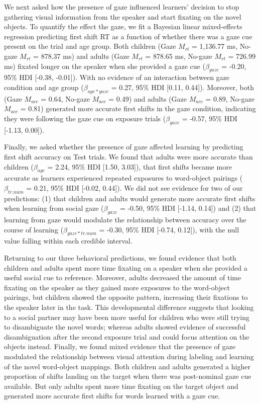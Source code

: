 \documentclass[10pt, letterpaper]{article}
\begin{document}
We next asked how the presence of gaze influenced learners' decision to
stop gathering visual information from the speaker and start fixating on
the novel objects. To quantify the effect the gaze, we fit a Bayesian
linear mixed-effects regression predicting first shift RT as a function
of whether there was a gaze cue present on the trial and age group. Both
children (Gaze \(M_{rt}\) = 1,136.77 ms, No-gaze \(M_{rt}\) = 878.37 ms)
and adults (Gaze \(M_{rt}\) = 878.65 ms, No-gaze \(M_{rt}\) = 726.99 ms)
fixated longer on the speaker when she provided a gaze cue
(\(\beta_{gaze}\) = -0.20, 95\% HDI {[}-0.38, -0.01{]}). With no
evidence of an interaction between gaze condition and age group
(\(\beta_{age*gaze}\) = 0.27, 95\% HDI {[}0.11, 0.44{]}). Moreover, both
(Gaze \(M_{acc}\) = 0.64, No-gaze \(M_{acc}\) = 0.49) and adults (Gaze
\(M_{acc}\) = 0.89, No-gaze \(M_{acc}\) = 0.81) generated more accurate
first shifts in the gaze condition, indicating they were following the
gaze cue on exposure trials (\(\beta_{gaze}\) = -0.57, 95\% HDI
{[}-1.13, 0.00{]}).

Finally, we asked whether the presence of gaze affected learning by
predicting first shift accuracy on Test trials. We found that adults
were more accurate than children (\(\beta_{age}\) = 2.24, 95\% HDI
{[}1.50, 3.03{]}), that first shifts became more accurate as learners
experienced repeated exposures to word-object pairings
(\(\beta_{tr.num}\) = 0.21, 95\% HDI {[}-0.02, 0.44{]}). We did not see
evidence for two of our predictions: (1) that children and adults would
generate more accurate first shifts when learning from social gaze
(\(\beta_{gaze}\) = -0.50, 95\% HDI {[}-1.14, 0.14{]}) and (2) that
learning from gaze would modulate the relationship between accuracy over
the course of learning (\(\beta_{gaze*tr.num}\) = -0.30, 95\% HDI
{[}-0.74, 0.12{]}), with the null value falling within each credible
interval.

Returning to our three behavioral predictions, we found evidence that
both children and adults spent more time fixating on a speaker when she
provided a useful social cue to reference. Moreover, adults decreased
the amount of time fixating on the speaker as they gained more exposures
to the word-object pairings, but children showed the opposite pattern,
increasing their fixations to the speaker later in the task. This
developmental difference suggests that looking to a social partner may
have been more useful for children who were still trying to disambiguate
the novel words; whereas adults showed evidence of successful
disambiguation after the second exposure trial and could focus attention
on the objects instead. Finally, we found mixed evidence that the
presence of gaze modulated the relationship between visual attention
during labeling and learning of the novel word-object mappings. Both
children and adults generated a higher proportion of shifts landing on
the target when there was post-nominal gaze cue available. But only
adults spent more time fixating on the target object and generated more
accurate first shifts for words learned with a gaze cue.
\end{document}
